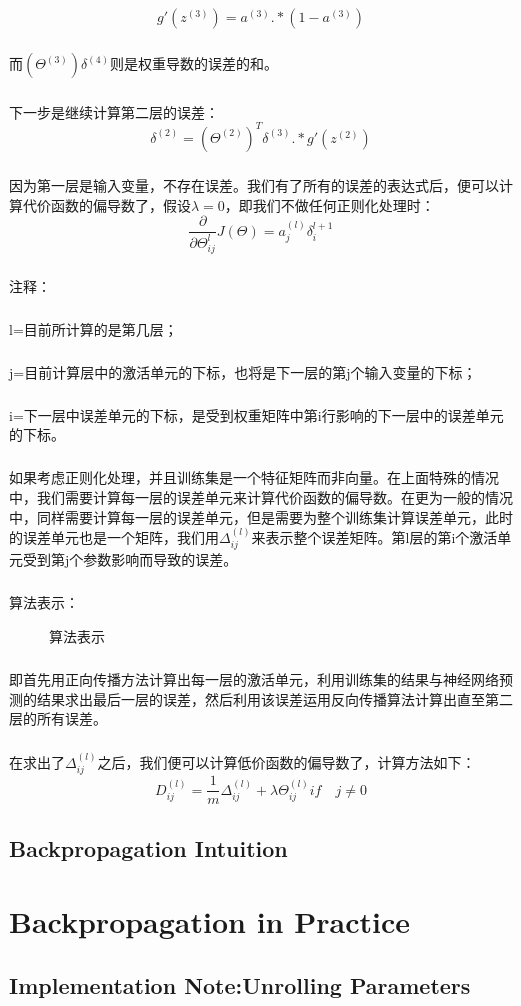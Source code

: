 \documentclass{article}
\begin{document}
\begin{CJK}{UTF8}{gbsn}
\begin{equation}
g'(z^{(3)})=a^{(3)}.*(1-a^{(3)})
\end{equation}
\subparagraph{}
而$(\Theta^{(3)})\delta^{(4)}$则是权重导数的误差的和。
\subparagraph{}
下一步是继续计算第二层的误差：
\begin{equation}
\delta^{(2)}=(\Theta^{(2)})^T\delta^{(3)}.*g'(z^{(2)})
\end{equation}
\subparagraph{}
因为第一层是输入变量，不存在误差。我们有了所有的误差的表达式后，便可以计算代价函数的偏导数了，假设$\lambda=0$，即我们不做任何正则化处理时：
\begin{equation}
\frac{\partial}{\partial\Theta_{ij}^{l}}J(\Theta)=a_j^{(l)}\delta_i^{l+1}
\end{equation}
\subparagraph{}
注释：
\subparagraph{}
l=目前所计算的是第几层；
\subparagraph{}
j=目前计算层中的激活单元的下标，也将是下一层的第j个输入变量的下标；
\subparagraph{}
i=下一层中误差单元的下标，是受到权重矩阵中第i行影响的下一层中的误差单元的下标。
\subparagraph{}
如果考虑正则化处理，并且训练集是一个特征矩阵而非向量。在上面特殊的情况中，我们需要计算每一层的误差单元来计算代价函数的偏导数。在更为一般的情况中，同样需要计算每一层的误差单元，但是需要为整个训练集计算误差单元，此时的误差单元也是一个矩阵，我们用$\Delta_{ij}^{(l)}$来表示整个误差矩阵。第l层的第i个激活单元受到第j个参数影响而导致的误差。
\subparagraph{}
算法表示：
\begin{figure}[H]
\caption{算法表示}
\label{fig:506}
\end{figure}
\subparagraph{}
即首先用正向传播方法计算出每一层的激活单元，利用训练集的结果与神经网络预测的结果求出最后一层的误差，然后利用该误差运用反向传播算法计算出直至第二层的所有误差。
\subparagraph{}
在求出了$\Delta_{ij}^{(l)}$之后，我们便可以计算低价函数的偏导数了，计算方法如下：
\begin{equation}
D_{ij}^{(l)}=\frac{1}{m}\Delta_{ij}^{(l)}+\lambda\Theta_{ij}^{(l)}  if\quad{j\neq0}
\end{equation}
\subsection{Backpropagation Intuition}
\subparagraph{}
\section{Backpropagation in Practice}
\subsection{Implementation Note:Unrolling Parameters}

\end{CJK}
\end{document}
